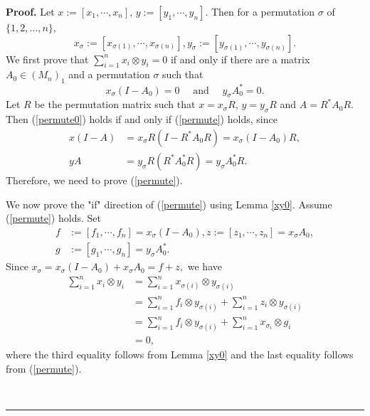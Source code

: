 \documentclass{article}%
\newenvironment{proof}[1][Proof]{\noindent\textbf{#1.} }{\ \rule{0.5em}{0.5em}}
\begin{document}
\begin{proof}
Let $x:=\left[  x_{1},\cdots,x_{n}\right]  $, $y:=\left[  y_{1},\cdots
,y_{n}\right]  $. Then for a permutation $\sigma$ of $\{1,2,\ldots,n\},$
\[
x_{\sigma}:=\left[  x_{\sigma(1)},\cdots,x_{\sigma(n)}\right]  ,y_{\sigma
}:=\left[  y_{\sigma(1)},\cdots,y_{\sigma(n)}\right]  .
\]
We first prove that $\sum_{i=1}^{n}x_{i}\otimes y_{i}=0$ if and only if there
are a matrix $A_{0}\in\left(  M_{n}\right)  _{1}$ and a permutation $\sigma$
such that
\begin{equation}
x_{\sigma}\left(  I-A_{0}\right)  =0\quad\text{ and }\quad y_{\sigma}%
A_{0}^{\ast}=0. \label{permute}%
\end{equation}
Let $R$ be the permutation matrix such that $x=x_{\sigma}R$, $y=y_{\sigma}R$
and $A=R^{\ast}A_{0}R$. Then (\ref{permute0}) holds if and only if
(\ref{permute}) holds, since%
\begin{align*}
x(I-A)  &  =x_{\sigma}R(I-R^{\ast}A_{0}R)=x_{\sigma}\left(  I-A_{0}\right)
R,\\
yA  &  =y_{\sigma}R(R^{\ast}A_{0}^{\ast}R)=y_{\sigma}A_{0}^{\ast}R.
\end{align*}
Therefore, we need to prove (\ref{permute}).

We now prove the "if" direction of (\ref{permute}) using Lemma \ref{xy0}.
Assume (\ref{permute}) holds. Set
\begin{align*}
f  &  :=\left[  f_{1},\cdots,f_{n}\right]  =x_{\sigma}(I-A_{0}),z:=\left[
z_{1},\cdots,z_{n}\right]  =x_{\sigma}A_{0},\\
g  &  :=\left[  g_{1},\cdots,g_{n}\right]  =y_{\sigma}A_{0}^{\ast}.
\end{align*}
Since $x_{\sigma}=x_{\sigma}(I-A_{0})+x_{\sigma}A_{0}=f+z,$ we have
\begin{align}
\sum_{i=1}^{n}x_{i}\otimes y_{i}  &  =\sum_{i=1}^{n}x_{\sigma(i)}\otimes
y_{\sigma(i)}\nonumber\\
&  =\sum_{i=1}^{n}f_{i}\otimes y_{\sigma(i)}+\sum_{i=1}^{n}z_{i}\otimes
y_{\sigma(i)}\nonumber\\
&  =\sum_{i=1}^{n}f_{i}\otimes y_{\sigma(i)}+\sum_{i=1}^{n}x_{\sigma_{i}%
}\otimes g_{i}\label{xya}\\
&  =0,\nonumber
\end{align}
where the third equality follows from Lemma \ref{xy0} and the last equality
follows from (\ref{permute}).


\end{proof}
\end{document}
